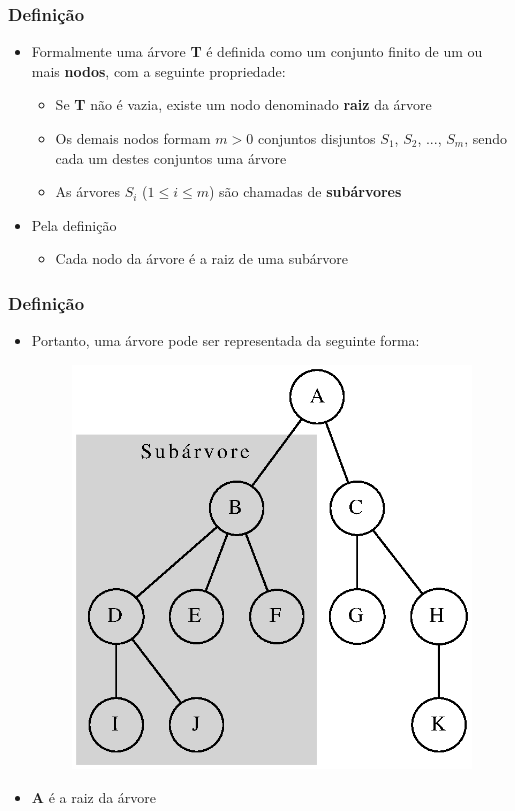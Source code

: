 \documentclass[aspectratio=169]{beamer}
\begin{document}
\begin{frame}\frametitle{Definição}
\begin{itemize}
	\item Formalmente uma árvore \textbf{T} é definida como um conjunto finito de um ou mais \textbf{nodos}, com a seguinte propriedade:
	\begin{itemize}
		\item Se \textbf{T} não é vazia, existe um nodo denominado \textbf{raiz} da árvore
		\item Os demais nodos formam $m > 0$ conjuntos disjuntos $S_1$, $S_2$, ..., $S_m$, sendo cada um destes conjuntos uma árvore
		\item As árvores $S_i$ ($1 \le i \le m$) são chamadas de \textbf{subárvores}
	\end{itemize}
	\item Pela definição
	\begin{itemize}
		\item Cada nodo da árvore é a raiz de uma subárvore
	\end{itemize}
\end{itemize}
\end{frame}

\begin{frame}\frametitle{Definição}
\begin{itemize}
	\item Portanto, uma árvore pode ser representada da seguinte forma:
\begin{figure}[h]
	\centering
	\includegraphics[height=0.60\paperheight]{imagens/arvore2.eps}
\end{figure}
	\item \textbf{A} é a raiz da árvore
\end{itemize}
\end{frame}
\end{document}
